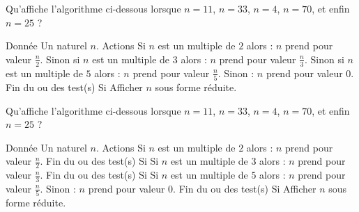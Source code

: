 \begin{multicols}{2}
    \algoname{}
    Qu'affiche l'algorithme ci-dessous lorsque $n=11$, $n=33$, $n=4$, $n=70$, et enfin $n=25$ ?
    \bigskip
    \begin{myverb}
Donnée
    Un naturel \(n\).
Actions
    Si \(n\) est un multiple de \(2\) alors :
        \(n\) prend pour valeur \(\frac{n}{2}\).
    Sinon si \(n\) est un multiple de \(3\) alors :
        \(n\) prend pour valeur \(\frac{n}{3}\).
    Sinon si \(n\) est un multiple de \(5\) alors :
        \(n\) prend pour valeur \(\frac{n}{5}\).
    Sinon :
        \(n\) prend pour valeur \(0\).
    Fin du ou des test(s) Si
    Afficher \(n\) sous forme réduite.
    \end{myverb}

    \switchcol

    \algoname{}
    Qu'affiche l'algorithme ci-dessous lorsque $n=11$, $n=33$, $n=4$, $n=70$, et enfin $n=25$ ?
    \bigskip
    \begin{myverb}
Donnée
    Un naturel \(n\).
Actions
    Si \(n\) est un multiple de \(2\) alors :
        \(n\) prend pour valeur \(\frac{n}{2}\).
    Fin du ou des test(s) Si
    Si \(n\) est un multiple de \(3\) alors :
        \(n\) prend pour valeur \(\frac{n}{3}\).
    Fin du ou des test(s) Si
    Si \(n\) est un multiple de \(5\) alors :
        \(n\) prend pour valeur \(\frac{n}{5}\).
    Sinon :
        \(n\) prend pour valeur \(0\).
    Fin du ou des test(s) Si
    Afficher \(n\) sous forme réduite.
    \end{myverb}
\end{multicols}
